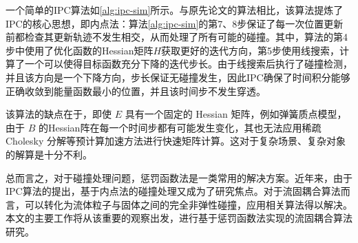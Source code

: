 一个简单的IPC算法如\ref{alg:ipc-sim}所示。与原先论文的算法相比，该算法提炼了IPC的核心思想，即内点法：算法\ref{alg:ipc-sim}的第7、8步保证了每一次位置更新前都检查其更新轨迹不发生相交，从而处理了所有可能的碰撞。其中，算法的第4步中使用了优化函数的Hessian矩阵$H$获取更好的迭代方向，第5步使用线搜索，计算了一个可以使得目标函数充分下降的迭代步长。由于线搜索后执行了碰撞检测，并且该方向是一个下降方向，步长保证无碰撞发生，因此IPC确保了时间积分能够正确收敛到能量函数最小的位置，并且该时间步不发生穿透。

该算法的缺点在于，即使 $E$ 具有一个固定的 Hessian 矩阵，例如弹簧质点模型，由于 $B$ 的Hessian阵在每一个时间步都有可能发生变化，其也无法应用稀疏 Cholesky 分解等预计算加速方法进行快速矩阵计算。这对于复杂场景、复杂对象的解算是十分不利。

总而言之，对于碰撞处理问题，惩罚函数法是一类常用的解决方案。近年来，由于IPC算法的提出，基于内点法的碰撞处理又成为了研究焦点。对于流固耦合算法而言，可以转化为流体粒子与固体之间的完全非弹性碰撞，应用相关算法得以解决。本文的主要工作将从该重要的观察出发，进行基于惩罚函数法实现的流固耦合算法研究。

